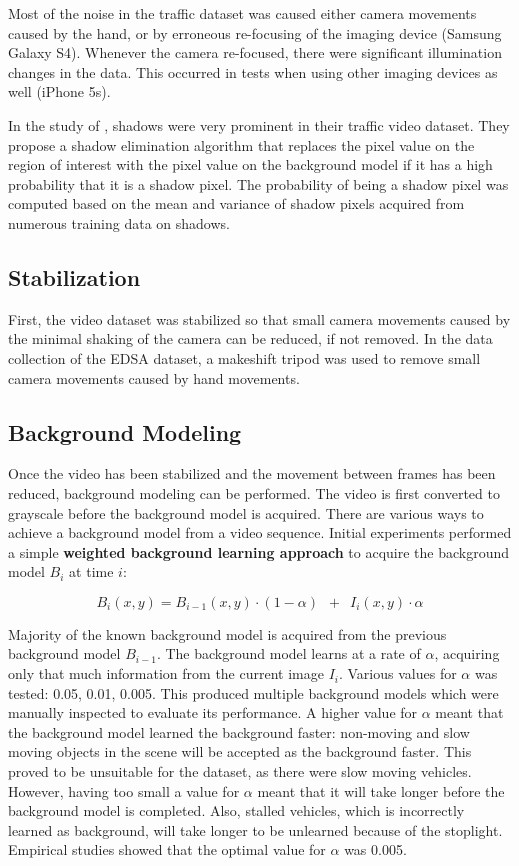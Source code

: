 \documentclass[conference]{IEEEtran}
\begin{document}
Most of the noise in the traffic dataset was caused either camera movements caused by the hand, or by erroneous re-focusing of the imaging device (Samsung Galaxy S4). Whenever the camera re-focused, there were significant illumination changes in the data. This occurred in tests when using other imaging devices as well (iPhone 5s).

In the study of \cite{Jun-Wei}, shadows were very prominent in their traffic video dataset. They propose a shadow elimination algorithm that replaces the pixel value on the region of interest with the pixel value on the background model if it has a high probability that it is a shadow pixel. The probability of being a shadow pixel was computed based on the mean and variance of shadow pixels acquired from numerous training data on shadows.

\subsection{Stabilization}
First, the video dataset was stabilized so that small camera movements caused by the minimal shaking of the camera can be reduced, if not removed. In the data collection of the EDSA dataset, a makeshift tripod was used to remove small camera movements caused by hand movements.

\subsection{Background Modeling}
Once the video has been stabilized and the movement between frames has been reduced, background modeling can be performed. The video is first converted to grayscale before the background model is acquired. There are various ways to achieve a background model from a video sequence. Initial experiments performed a simple \textbf{weighted background learning approach} to acquire the background model $B_i$ at time $i$:

$$
B_i(x, y) = B_{i-1}(x, y) \cdot (1 - \alpha) \enspace + \enspace I_i(x,y) \cdot \alpha
$$

Majority of the known background model is acquired from the previous background model $B_{i-1}$. The background model learns at a rate of $\alpha$, acquiring only that much information from the current image $I_i$. Various values for $\alpha$ was tested: 0.05, 0.01, 0.005. This produced multiple background models which were manually inspected to evaluate its performance. A higher value for $\alpha$ meant that the background model learned the background faster: non-moving and slow moving objects in the scene will be accepted as the background faster. This proved to be unsuitable for the dataset, as there were slow moving vehicles. However, having too small a value for $\alpha$ meant that it will take longer before the background model is completed. Also, stalled vehicles, which is incorrectly learned as background, will take longer to be unlearned because of the stoplight. Empirical studies showed that the optimal value for $\alpha$ was 0.005.
\end{document}
